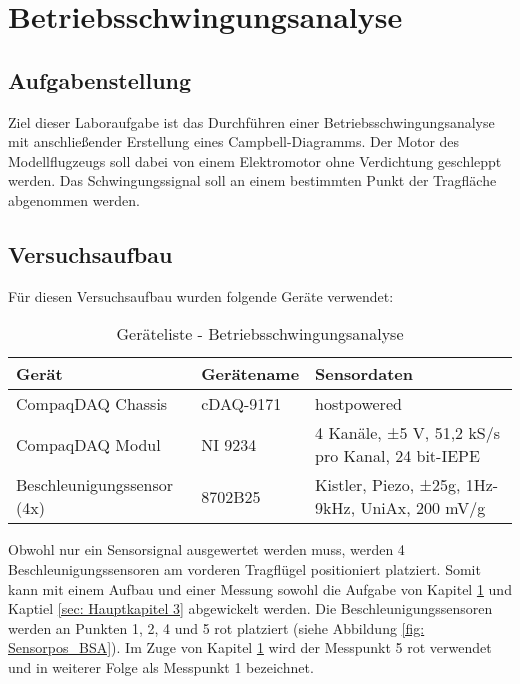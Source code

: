 \chapter{Betriebsschwingungsanalyse}
\label{sec: Hauptkapitel 2}


\section{Aufgabenstellung}
    Ziel dieser Laboraufgabe ist das Durchführen einer Betriebsschwingungsanalyse
    mit anschließender Erstellung eines Campbell-Diagramms. Der Motor des
    Modellflugzeugs soll dabei von einem Elektromotor ohne Verdichtung
    geschleppt werden. Das Schwingungssignal soll an einem bestimmten Punkt der
    Tragfläche abgenommen werden.

\section{Versuchsaufbau}
    Für diesen Versuchsaufbau wurden folgende Geräte verwendet:

    \begin{table}[H]
        \centering
        \begin{tabular}{|l|l|p{6cm}|}
            \hline
            \textbf{Gerät}  &   \textbf{Gerätename}   &   \textbf{Sensordaten} \\
            \hline \hline
            CompaqDAQ Chassis & cDAQ-9171 & hostpowered \\
            \hline
            CompaqDAQ Modul & NI 9234 & 4 Kanäle, ±5 V, 51,2 kS/s pro Kanal, 24 bit-IEPE  \\
            \hline
            Beschleunigungssensor (4x) & 8702B25 & Kistler, Piezo, ±25g, 1Hz-9kHz, UniAx, 200 mV/g  \\
            \hline
        \end{tabular}
        \caption{Geräteliste - Betriebsschwingungsanalyse}
        \label{tab: Geräteliste_BSA}
    \end{table}

    \noindent
    Obwohl nur ein Sensorsignal ausgewertet werden muss, werden 4
    Beschleunigungssensoren am vorderen Tragflügel positioniert platziert.
    Somit kann mit einem Aufbau und einer Messung sowohl die Aufgabe von Kapitel
    \ref{sec: Hauptkapitel 2} und Kaptiel \ref{sec: Hauptkapitel 3}
    abgewickelt werden. Die Beschleunigungssensoren werden an Punkten 1, 2, 4 und
    5 rot platziert (siehe Abbildung \ref{fig: Sensorpos_BSA}). Im Zuge von
    Kapitel \ref{sec: Hauptkapitel 2} wird der Messpunkt 5 rot verwendet und in
    weiterer Folge als Messpunkt 1 bezeichnet.


